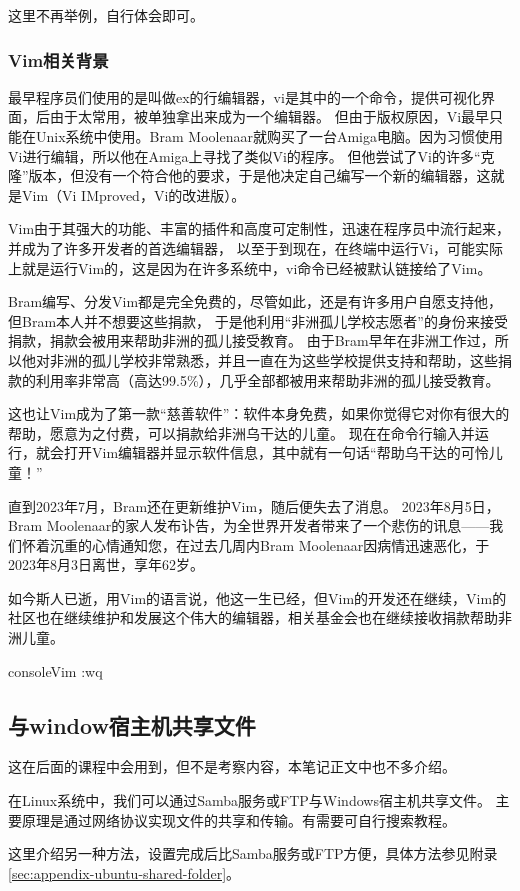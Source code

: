 这里不再举例，自行体会即可。

\subsubsection{Vim相关背景}
最早程序员们使用的是叫做ex的行编辑器，vi是其中的一个命令，提供可视化界面，后由于太常用，被单独拿出来成为一个编辑器。
但由于版权原因，Vi最早只能在Unix系统中使用。Bram Moolenaar就购买了一台Amiga电脑。因为习惯使用Vi进行编辑，所以他在Amiga上寻找了类似Vi的程序。
但他尝试了Vi的许多“克隆”版本，但没有一个符合他的要求，于是他决定自己编写一个新的编辑器，这就是Vim（Vi IMproved，Vi的改进版）。

Vim由于其强大的功能、丰富的插件和高度可定制性，迅速在程序员中流行起来，并成为了许多开发者的首选编辑器，
以至于到现在，在终端中运行Vi，可能实际上就是运行Vim的，这是因为在许多系统中，vi命令已经被默认链接给了Vim。

Bram编写、分发Vim都是完全免费的，尽管如此，还是有许多用户自愿支持他，但Bram本人并不想要这些捐款，
于是他利用“非洲孤儿学校志愿者”的身份来接受捐款，捐款会被用来帮助非洲的孤儿接受教育。
由于Bram早年在非洲工作过，所以他对非洲的孤儿学校非常熟悉，并且一直在为这些学校提供支持和帮助，这些捐款的利用率非常高（高达99.5\%），几乎全部都被用来帮助非洲的孤儿接受教育。

这也让Vim成为了第一款“慈善软件”：软件本身免费，如果你觉得它对你有很大的帮助，愿意为之付费，可以捐款给非洲乌干达的儿童。
现在在命令行输入并运行，就会打开Vim编辑器并显示软件信息，其中就有一句话“帮助乌干达的可怜儿童！”

直到2023年7月，Bram还在更新维护Vim，随后便失去了消息。
2023年8月5日，Bram Moolenaar的家人发布讣告，为全世界开发者带来了一个悲伤的讯息——我们怀着沉重的心情通知您，在过去几周内Bram Moolenaar因病情迅速恶化，于2023年8月3日离世，享年62岁。

如今斯人已逝，用Vim的语言说，他这一生已经，但Vim的开发还在继续，Vim的社区也在继续维护和发展这个伟大的编辑器，相关基金会也在继续接收捐款帮助非洲儿童。

\begin{envcode}{console}{Vim}
:wq
\end{envcode}

\subsection{与window宿主机共享文件}
这在后面的课程中会用到，但不是考察内容，本笔记正文中也不多介绍。

在Linux系统中，我们可以通过Samba服务或FTP与Windows宿主机共享文件。
主要原理是通过网络协议实现文件的共享和传输。有需要可自行搜索教程。

这里介绍另一种方法，设置完成后比Samba服务或FTP方便，具体方法参见附录\ref{sec:appendix-ubuntu-shared-folder}。
